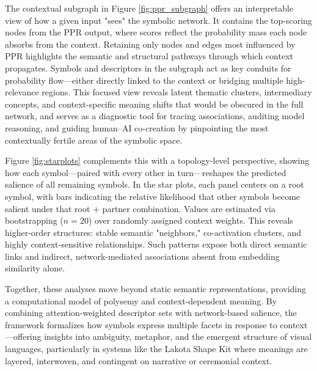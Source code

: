 \documentclass[final,creativeai]{article}
\begin{document}
The contextual subgraph in Figure \ref{fig:ppr_subgraph} offers an interpretable view of how a given input "sees" the symbolic network. It contains the top-scoring nodes from the PPR output, where scores reflect the probability mass each node absorbs from the context. Retaining only nodes and edges most influenced by PPR highlights the semantic and structural pathways through which context propagates. Symbols and descriptors in the subgraph act as key conduits for probability flow—either directly linked to the context or bridging multiple high-relevance regions. This focused view reveals latent thematic clusters, intermediary concepts, and context-specific meaning shifts that would be obscured in the full network, and serves as a diagnostic tool for tracing associations, auditing model reasoning, and guiding human–AI co-creation by pinpointing the most contextually fertile areas of the symbolic space.

Figure \ref{fig:starplots} complements this with a topology-level perspective, showing how each symbol—paired with every other in turn—reshapes the predicted salience of all remaining symbols. In the star plots, each panel centers on a root symbol, with bars indicating the relative likelihood that other symbols become salient under that root + partner combination. Values are estimated via bootstrapping ($n=20$) over randomly assigned context weights. This reveals higher-order structures: stable semantic "neighbors," co-activation clusters, and highly context-sensitive relationships. Such patterns expose both direct semantic links and indirect, network-mediated associations absent from embedding similarity alone.

Together, these analyses move beyond static semantic representations, providing a computational model of polysemy and context-dependent meaning. By combining attention-weighted descriptor sets with network-based salience, the framework formalizes how symbols express multiple facets in response to context—offering insights into ambiguity, metaphor, and the emergent structure of visual languages, particularly in systems like the Lakota Shape Kit where meanings are layered, interwoven, and contingent on narrative or ceremonial context.
\end{document}
